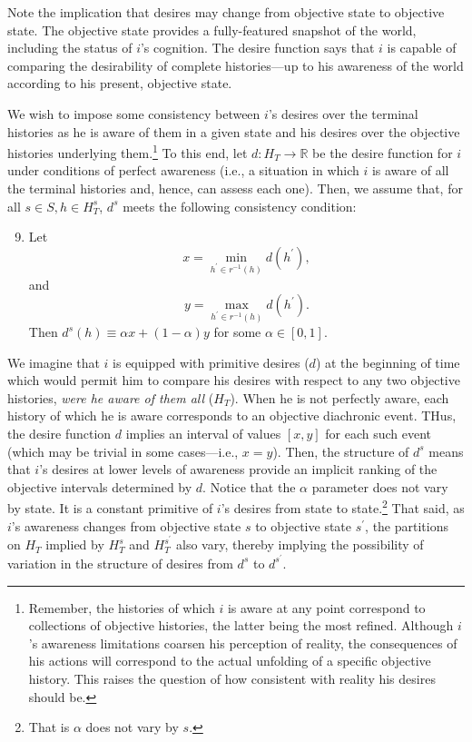 \documentclass[
11pt,
titlepage,
reqno,
]{article}%
\theoremstyle{definition}
\begin{document}
Note the implication that desires may change from objective state to objective state.
The objective state provides a fully-featured snapshot of the world, including the status of $i$'s cognition. 
The desire function says that $i$ is capable of comparing the desirability of complete histories---up to his awareness of the world according to his present, objective state.

We wish to impose some consistency between $i$'s desires over the terminal histories as he is aware of them in a given state and his desires over the objective histories underlying them.\footnote
{
	Remember, the histories of which $i$ is aware at any point correspond to collections of objective histories, the latter being the most refined. 
	Although $i$'s awareness limitations coarsen his perception of reality, the consequences of his actions will correspond to the actual unfolding of a specific objective history. 
	This raises the question of how consistent with reality his desires should be.
}
To this end, let $d:H_T\rightarrow \mathbb{R}$ be the desire function for $i$ under conditions of perfect awareness (i.e., a situation in which $i$ is aware of all the terminal histories and, hence, can assess each one).
Then, we assume that, for all $s\in S,h\in H^s_T$, $d^s$ meets the following consistency condition:
\begin{enumerate}
	\setcounter{enumi}{8}
	\item Let 
	\[
		x=\min_{h^\prime\in r^{-1}(h)}d(h^\prime),
	\]
	 and  
	 \[
	 	y=\max_{h^\prime\in r^{-1}(h)}d(h^\prime).
	 \]
	 Then $d^s(h)\equiv\alpha x + (1-\alpha)y$ for some $\alpha\in[0,1]$. 
\end{enumerate}
We imagine that $i$ is equipped with primitive desires ($d$) at the beginning of time which would permit him to compare his desires with respect to any two objective histories, \textit{were he aware of them all} ($H_T$).
When he is not perfectly aware, each history of which he is aware corresponds to an objective diachronic event.
THus, the desire function $d$ implies an interval of values $[x,y]$ for each such event (which may be trivial in some cases---i.e., $x=y$).
Then, the structure of $d^s$ means that $i$'s desires at lower levels of awareness provide an implicit ranking of the objective intervals determined by   $d$.
Notice that the $\alpha$ parameter does not vary by state. 
It is a constant primitive of $i$'s desires from state to state.\footnote
{
	That is $\alpha$ does not vary by $s$.
}
That said, as $i$'s awareness  changes from objective state $s$ to objective state $s^\prime$, the partitions on $H_T$ implied by $H^s_T$ and $H^{s^\prime}_T$ also vary, thereby implying the possibility of variation in the structure of desires from $d^s$ to $d^{s^\prime}$. 
\end{document}
